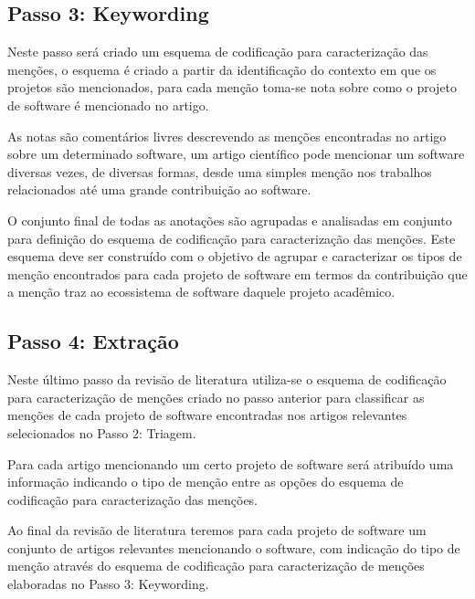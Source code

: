 \subsection{Passo 3: Keywording}

Neste passo será criado um esquema de codificação para caracterização das
menções, o esquema é criado a partir da identificação do contexto em que os
projetos são mencionados, para cada menção toma-se nota sobre como o projeto de
software é mencionado no artigo.

As notas são comentários livres descrevendo as menções encontradas no artigo
sobre um determinado software, um artigo científico pode mencionar um software
diversas vezes, de diversas formas, desde uma simples menção nos trabalhos
relacionados até uma grande contribuição ao software.

O conjunto final de todas as anotações são agrupadas e analisadas em conjunto
para definição do esquema de codificação para caracterização das menções. Este
esquema deve ser construído com o objetivo de agrupar e caracterizar os tipos
de menção encontrados para cada projeto de software em termos da contribuição
que a menção traz ao ecossistema de software daquele projeto acadêmico.


\subsection{Passo 4: Extração}

Neste último passo da revisão de literatura utiliza-se o esquema de codificação
para caracterização de menções criado no passo anterior para classificar as
menções de cada projeto de software encontradas nos artigos relevantes
selecionados no Passo 2: Triagem.

Para cada artigo mencionando um certo projeto de software será atribuído uma
informação indicando o tipo de menção entre as opções do esquema de codificação
para caracterização das menções.

Ao final da revisão de literatura teremos para cada projeto de software um
conjunto de artigos relevantes mencionando o software, com indicação do tipo de menção
através do esquema de codificação para caracterização de menções elaboradas no Passo 3: Keywording.

